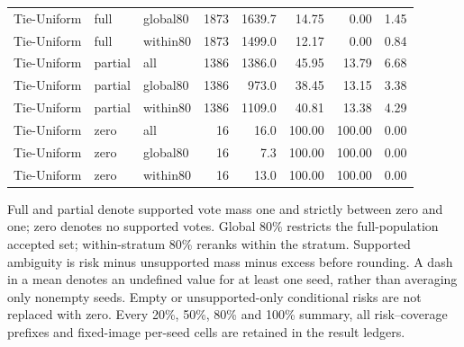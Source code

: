 \begin{longtable}{lllrrrrr}
Tie-Uniform & full & global80 & 1873 & 1639.7 & 14.75 & 0.00 & 1.45\\
Tie-Uniform & full & within80 & 1873 & 1499.0 & 12.17 & 0.00 & 0.84\\
Tie-Uniform & partial & all & 1386 & 1386.0 & 45.95 & 13.79 & 6.68\\
Tie-Uniform & partial & global80 & 1386 & 973.0 & 38.45 & 13.15 & 3.38\\
Tie-Uniform & partial & within80 & 1386 & 1109.0 & 40.81 & 13.38 & 4.29\\
Tie-Uniform & zero & all & 16 & 16.0 & 100.00 & 100.00 & 0.00\\
Tie-Uniform & zero & global80 & 16 & 7.3 & 100.00 & 100.00 & 0.00\\
Tie-Uniform & zero & within80 & 16 & 13.0 & 100.00 & 100.00 & 0.00\\
\bottomrule\end{longtable}\endgroup

Full and partial denote supported vote mass one and strictly between zero and one; zero denotes no supported votes. Global 80\% restricts the full-population accepted set; within-stratum 80\% reranks within the stratum. Supported ambiguity is risk minus unsupported mass minus excess before rounding. A dash in a mean denotes an undefined value for at least one seed, rather than averaging only nonempty seeds. Empty or unsupported-only conditional risks are not replaced with zero. Every 20\%, 50\%, 80\% and 100\% summary, all risk--coverage prefixes and fixed-image per-seed cells are retained in the result ledgers.
